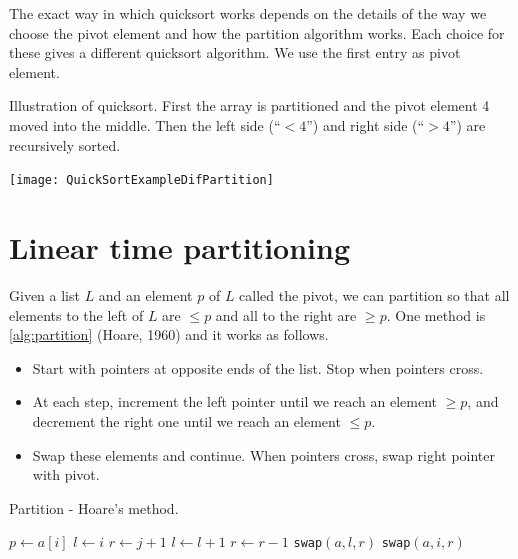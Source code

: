 The exact way in which quicksort works depends on the details of the way we choose the pivot element and how the 
partition algorithm works. Each choice for these gives a different quicksort algorithm.
We use the first entry as pivot element.

\begin{Boxample} \label{ex:quicksortSmall}
Illustration of quicksort. First the array is partitioned and the pivot element 4 moved into the middle. 
Then the left side (``$< 4$'') and right side (``$> 4$'') are recursively sorted.
\begin{center}
  \texttt{[image: QuickSortExampleDifPartition]}
\end{center}
\end{Boxample}


\section{Linear time partitioning}
Given a list $L$ and an element $p$ of $L$ called the pivot, we can partition so
 that all elements to the left of $L$ are $\leq p$ and all to the right are 
$\geq p$. One method is \cref{alg:partition} (Hoare, 1960) and it works as follows.
\begin{itemize}
\item Start with pointers at opposite ends of the list. Stop when pointers cross.
\item At each step, increment the left pointer until we reach an element $\geq p$, and decrement the right one until we reach an element $\leq p$. 
\item Swap these elements and continue. When pointers cross, swap right pointer with pivot.
\end{itemize}

\begin{algorithm}[H]
  \caption{Partition - Hoare's method.}
    \label{alg:partition}
\begin{algorithmic}[0]
	\State $p \gets a[i]$ 
	\State $l \gets i $ 
	\State $r \gets j+1$ 
		\Repeat
			\State $l \gets l+1$ 
		\Repeat
			\State $r \gets r-1$ 
			\State \texttt{swap}$(a,l,r)$  
		\Else
			\State \texttt{swap}$(a,i,r)$  
			\State {}
		\EndIf
	\EndWhile
\EndFunction  
\end{algorithmic}
\end{algorithm}

